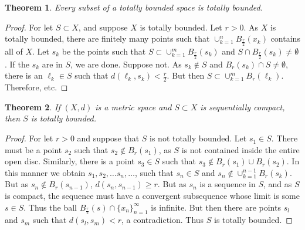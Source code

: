 \documentclass[oneside]{book}
\theoremstyle{mystyle}
\newtheorem{theorem}{Theorem}[section]
\begin{document}
\begin{theorem}
Every subset of a totally bounded space is totally bounded.
\end{theorem}
\begin{proof}
For let $S\subset X$, and suppose $X$ is totally bounded. Let $r>0$. As $X$ is totally bounded, there are finitely many points such that $\cup_{k=1}^{n} B_{\frac{r}{2}}(x_k)$ contains all of $X$. Let $s_k$ be the points such that $S\subset \cup_{k=1}^{m} B_{\frac{r}{2}}(s_k)$ and $S\cap B_{\frac{r}{2}}(s_k) \ne \emptyset$. If the $s_k$ are in $S$, we are done. Suppose not. As $s_k \notin S$ and $B_{r}(s_k)\cap S \ne \emptyset$, there is an $\ell_k \in S$ such that $d(\ell_k,s_k)< \frac{r}{2}$. But then $S\subset \cup_{k=1}^{m} B_{r}(\ell_k)$. Therefore, etc.
\end{proof}

\begin{theorem}
If $(X,d)$ is a metric space and $S\subset X$ is sequentially compact, then $S$ is totally bounded.
\end{theorem}
\begin{proof}
For let $r>0$ and suppose that $S$ is not totally bounded. Let $s_1\in S$. There must be a point $s_2$ such that $s_2 \notin B_{r}(s_1)$, as $S$ is not contained inside the entire open disc. Similarly, there is a point $s_3\in S$ such that $s_3 \notin B_r(s_1)\cup B_r(s_2)$. In this manner we obtain $s_1, s_2, \hdots s_n, \hdots$, such that $s_n \in S$ and $s_n \notin \cup_{k=1}^{n-1}B_r(s_k)$. But as $s_n \notin B_r(s_{n-1})$, $d(s_n, s_{n-1})\geq r$. But as $s_n$ is a sequence in $S$, and as $S$ is compact, the sequence must have a convergent subsequence whose limit is some $s\in S$. Thus the ball $B_{\frac{r}{2}}(s)\cap \{x_n\}_{n=1}^{\infty}$ is infinite. But then there are points $s_{l}$ and $s_{m}$ such that $d(s_l,s_m)<r$, a contradiction. Thus $S$ is totally bounded.
\end{proof}
\end{document}

